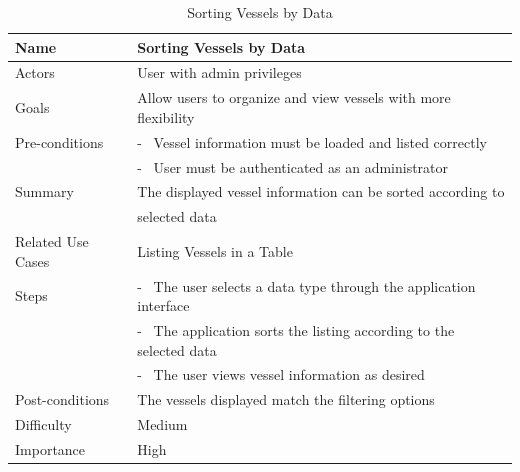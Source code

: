 \documentclass[12pt]{article}
\begin{document}
\begin{table}[ht]
\centering
   \begin{tabular}{|l|l|}
        \hline
        {\large Name} & {\large Sorting Vessels by Data} \\
        \hline\hline
        Actors & User with admin privileges\\
        \hline
        Goals & Allow users to organize and view vessels with more flexibility\\
        \hline
        Pre-conditions & - \ Vessel information must be loaded and listed correctly\\
         & - \ User must be authenticated as an administrator\\
        \hline
        Summary & The displayed vessel information can be sorted according to\\
         & selected data\\
        \hline
        Related Use Cases & Listing Vessels in a Table\\
        \hline
        Steps & - \ The user selects a data type through the application interface\\
         & - \ The application sorts the listing according to the selected data\\
          & - \ The user views vessel information as desired\\
        \hline
        Post-conditions & The vessels displayed match the filtering options\\
        \hline
        Difficulty & Medium\\
        \hline
        Importance & High\\
        \hline
    \end{tabular}
\caption{Sorting Vessels by Data}
\end{table}
\end{document}
